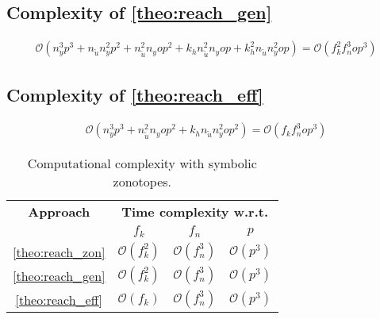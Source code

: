 \documentclass{article}
\begin{document}
\subsection{Complexity of \cref{theo:reach_gen}}
\begin{align*}
\mathcal{O}(n_y^3 p^3 
+ n_{\tilde{u}} n_y^2 p^2 
+ n_{\tilde{u}}^2 n_y o p^2 + k_h n_{\tilde{u}}^2 n_y o p + k_h^2 n_{\tilde{u}} n_y^2 o p) =
\mathcal{O}(f_k^2 f_n^3 o p^3)
\end{align*}


\subsection{Complexity of \cref{theo:reach_eff}}
\begin{align*}
\mathcal{O}(n_y^3 p^3 
+ n_{\tilde{u}}^2 n_y o p^2
+ k_h n_{\tilde{u}} n_y^2 o p^2) =
\mathcal{O}(f_k f_n^3 o p^3)
\end{align*}

\begin{table}[hb]
\vspace{0.2cm}
    \caption{Computational complexity with symbolic zonotopes.}
    \label{tab:complexity}
    \centering
    \begin{tabular}{c c c c}
       \toprule
       \textbf{Approach} & \multicolumn{3}{c}{\textbf{Time complexity w.r.t.}}\\
        &  $f_k$ & $f_n$ & $p$  \\
       \midrule 
        \cref{theo:reach_zon} & $\mathcal{O}(f_k^2)$ & $\mathcal{O}(f_n^3)$ & $\mathcal{O}(p^3)$\\ 
        \cref{theo:reach_gen}  & $\mathcal{O}(f_k^2)$ & $\mathcal{O}(f_n^3)$  & $\mathcal{O}(p^3)$ \\ 
        \cref{theo:reach_eff}  & $\mathcal{O}(f_k)$ & $\mathcal{O}(f_n^3)$  & $\mathcal{O}(p^3)$ \\ 
        \bottomrule
    \end{tabular}
    \vspace{-0.5cm}
\end{table}
\end{document}
